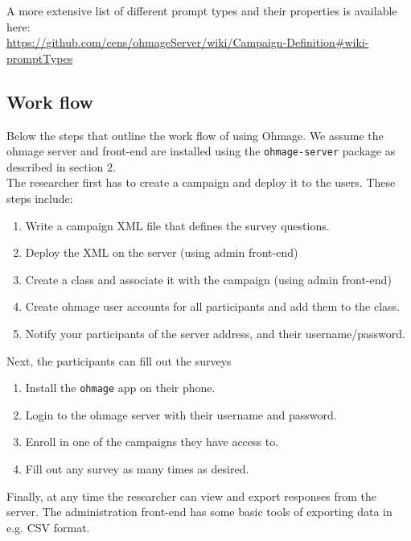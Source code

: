 \documentclass{scrartcl}
\begin{document}
\noindent A more extensive list of different prompt types and their properties
is available here: \\

\url{https://github.com/cens/ohmageServer/wiki/Campaign-Definition#wiki-promptTypes}

\subsection{Work flow}

Below the steps that outline the work flow of using Ohmage. We assume the ohmage
server and front-end are installed using the \texttt{ohmage-server} package as
described in section 2.\\

\noindent The researcher first has to create a campaign and deploy it to the
users. These steps include:

\begin{enumerate}
  \item Write a campaign XML file that defines the survey questions.
  \item Deploy the XML on the server (using admin front-end)
  \item Create a class and associate it with the campaign (using admin
  front-end)
  \item Create ohmage user accounts for all participants and add them to
  the class.
  \item Notify your participants of the server address, and their
  username/password.
\end{enumerate}

\noindent Next, the participants can fill out the surveys

\begin{enumerate}
  \item Install the \texttt{ohmage} app on their phone.
  \item Login to the ohmage server with their username and password.
  \item Enroll in one of the campaigns they have access to.
  \item Fill out any survey as many times as desired.
\end{enumerate}

\noindent Finally, at any time the researcher can view and export responses from
the server. The administration front-end has some basic tools of exporting data
in e.g. CSV format.
\end{document}
